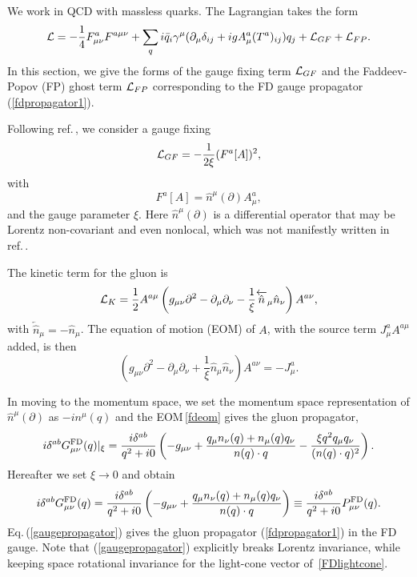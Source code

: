 \documentclass[preprint,amsmath,amssymb,superscriptaddress, floatfix,nofootinbib]{revtex4}
\begin{document}
We work in QCD with massless quarks. The Lagrangian takes the form 
\begin{equation}
{\cal L} = -\frac{1}{4}F^a_{\mu\nu}F^{a\mu\nu} 
+ \sum_q i \bar{q}_i \gamma^{\mu}(\partial_{\mu}\delta_{ij} +ig A_{\mu}^a (T^a)_{ij}) q_j 
+{\cal L}_{GF}+{\cal L}_{FP} . 
\label{lagrangian} 
\end{equation}
%
In this section, we give the forms of the gauge fixing term ${\cal L}_{GF}$ and the 
Faddeev-Popov (FP) ghost term ${\cal L}_{FP}$ corresponding to 
the FD gauge propagator (\ref{fdpropagator1}). 

Following ref.\,\cite{Chen:2022xlg}, we consider a gauge fixing 
%
\begin{equation}
{\cal L}_{GF} = -\frac{1}{2\xi}  (F^a[A])^2 ,
\label{FDgaugefixing0a}
\end{equation}
% 
with 
\begin{equation}
F^a[A] = \hat{n}^{\mu}(\partial) A_{\mu}^a , 
\label{FDgaugefixing0}
\end{equation}
and the gauge parameter $\xi$. 
Here $\hat{n}^{\mu}(\partial)$ is a differential operator that may be 
Lorentz non-covariant and even nonlocal, which was not manifestly written 
in ref.\,\cite{Chen:2022xlg}.  

The kinetic term for the gluon is 
\begin{equation}
{\cal L}_K= \frac{1}{2}A^{a\mu} \left( 
g_{\mu\nu} \partial^2 -\partial_{\mu}\partial_{\nu} 
-\frac{1}{\xi} \overleftarrow{\hat{n}}_{\mu}\hat{n}_{\nu} \right) A^{a\nu} ,
\end{equation}
with $\overleftarrow{\hat{n}}_{\mu}=-\hat{n}_{\mu}$. 
The equation of motion (EOM) of $A$, with the source term $J^a_{\mu}A^{a\mu}$ 
added, is then 
%
\begin{equation}
\left( 
g_{\mu\nu} \partial^2 -\partial_{\mu}\partial_{\nu} 
+\frac{1}{\xi} \hat{n}_{\mu}\hat{n}_{\nu} \right) A^{a\nu}= -J^a_{\mu} .
\label{fdeom}
\end{equation}


In moving to the momentum space, 
we set the momentum space representation of $\hat{n}^{\mu}(\partial)$ as $-in^{\mu}(q)$
and the EOM\,\eqref{fdeom} gives the gluon propagator,
\begin{equation}
i\delta^{ab}G_{\mu\nu}^{\rm FD}(q)|_{\xi} = 
\frac{i\delta^{ab}}{q^2+i0} \left( -g_{\mu\nu}+\frac{q_{\mu}n_{\nu}(q)+n_{\mu}(q)q_{\nu}} 
{n(q)\cdot q} -\frac{\xi q^2 q_{\mu} q_{\nu} }{(n(q)\cdot q)^2} 
\right) . 
\label{gaugepropagator-xi}
\end{equation}
Hereafter we set $\xi\to 0$ and obtain
\begin{equation}
i\delta^{ab}G_{\mu\nu}^{\rm FD}(q) = 
\frac{i\delta^{ab}}{q^2+i0} \left( -g_{\mu\nu}+\frac{q_{\mu}n_{\nu}(q)+n_{\mu}(q)q_{\nu}} 
{n(q)\cdot q}  
\right)  \equiv 
\frac{i\delta^{ab}}{q^2+i0}P_{\mu\nu}^{\rm FD}(q) . 
\label{gaugepropagator}
\end{equation}
Eq.\,(\ref{gaugepropagator}) gives the gluon propagator (\ref{fdpropagator1})
in the FD gauge. 
Note that (\ref{gaugepropagator}) explicitly breaks Lorentz invariance, 
while keeping space rotational invariance for the light-cone vector of~\eqref{FDlightcone}. 
\end{document}
